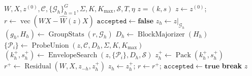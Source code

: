 \begin{algorithm}[t]
\caption{Joint codeword optimization under a shared scale}
\label{alg:joint}
\begin{algorithmic}[1]
\Require $W,X,z^{(0)},\mathcal C,\{\mathcal G_h\}_{h=1}^{G},\Sigma,K,K_{\max},\mathcal S,T,\eta$
\Ensure $z=(k,s)$
\State $z\gets z^{(0)}$; $r\gets\operatorname{vec}(WX-\widehat W(z)X)$
    \State $\mathtt{accepted}\gets\textbf{false}$
        \State $z_h\gets z|_{\mathcal G_h}$
        \State $(g_h,H_h)\gets\operatorname{GroupStats}(r,\mathcal G_h)$
        \State $D_h\gets\operatorname{BlockMajorizer}(H_h)$
        \State $\{\mathcal P_i\}\gets\operatorname{ProbeUnion}(z,\mathcal C,D_h,\Sigma,K,K_{\max})$
        \State $(k_h^+,s_h^+)\gets\operatorname{EnvelopeSearch}(z,\{\mathcal P_i\},D_h,\mathcal S)$
        \State $z_h^+\gets\operatorname{Pack}(k_h^+,s_h^+)$
        \State $r^+\gets\operatorname{Residual}(W,X,z_{-h},z_h^+)$
            \State $z_h\gets z_h^+$; $r\gets r^+$; $\mathtt{accepted}\gets\textbf{true}$
        \EndIf
    \EndFor
        \State \textbf{break}
    \EndIf
\EndFor
\State \Return $z$
\end{algorithmic}
\end{algorithm}
